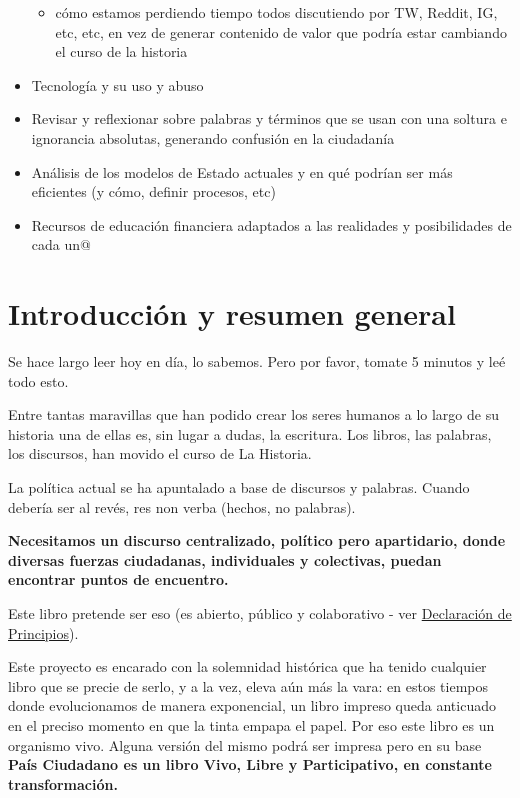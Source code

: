 \documentclass[
]{book}
\providecommand{\tightlist}{%
  \setlength{\itemsep}{0pt}\setlength{\parskip}{0pt}}
\begin{document}
\begin{itemize}
  \begin{itemize}
  \tightlist
  \item
    cómo estamos perdiendo tiempo todos discutiendo por TW, Reddit, IG, etc, etc, en vez de generar contenido de valor que podría estar cambiando el curso de la historia
  \end{itemize}
\item
  Tecnología y su uso y abuso
\item
  Revisar y reflexionar sobre palabras y términos que se usan con una soltura e ignorancia absolutas, generando confusión en la ciudadanía
\item
  Análisis de los modelos de Estado actuales y en qué podrían ser más eficientes (y cómo, definir procesos, etc)
\item
  Recursos de educación financiera adaptados a las realidades y posibilidades de cada un@
\end{itemize}

\hypertarget{intro}{%
\chapter{Introducción y resumen general}\label{intro}}

Se hace largo leer hoy en día, lo sabemos. Pero por favor, tomate 5 minutos y leé todo esto.

Entre tantas maravillas que han podido crear los seres humanos a lo largo de su historia una de ellas es, sin lugar a dudas, la escritura. Los libros, las palabras, los discursos, han movido el curso de La Historia.

La política actual se ha apuntalado a base de discursos y palabras. Cuando debería ser al revés, res non verba (hechos, no palabras).

\textbf{Necesitamos un discurso centralizado, político pero apartidario, donde diversas fuerzas ciudadanas, individuales y colectivas, puedan encontrar puntos de encuentro.}

Este libro pretende ser eso (es abierto, público y colaborativo - ver \protect\hyperlink{declaraciuxf3n-de-principios}{Declaración de Principios}).

Este proyecto es encarado con la solemnidad histórica que ha tenido cualquier libro que se precie de serlo, y a la vez, eleva aún más la vara: en estos tiempos donde evolucionamos de manera exponencial, un libro impreso queda anticuado en el preciso momento en que la tinta empapa el papel. Por eso este libro es un organismo vivo. Alguna versión del mismo podrá ser impresa pero en su base \textbf{País Ciudadano es un libro Vivo, Libre y Participativo, en constante transformación.}
\end{document}
